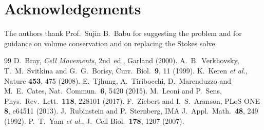 \documentclass[11pt]{article}
\begin{document}
\section*{Acknowledgements}
\noindent
The authors thank Prof.\ Sujin B.\ Babu for suggesting the problem and for
guidance on volume conservation and on replacing the Stokes solve.

{\footnotesize
\begin{thebibliography}{99}
\setlength{\itemsep}{0pt}
\setlength{\parsep}{0pt}
\setlength{\parskip}{0pt}
  D.~Bray, \textit{Cell Movements}, 2nd~ed., Garland (2000).
  A.~B.~Verkhovsky, T.~M.~Svitkina and G.~G.~Borisy, Curr.\ Biol.\ {\bf 9}, 11 (1999).
  K.~Keren \textit{et al.}, Nature {\bf 453}, 475 (2008).
  E.~Tjhung, A.~Tiribocchi, D.~Marenduzzo and M.~E.~Cates, Nat.\ Commun.\ {\bf 6}, 5420 (2015).
  M.~Leoni and P.~Sens, Phys.\ Rev.\ Lett.\ {\bf 118}, 228101 (2017).
  F.~Ziebert and I.~S.~Aranson, PLoS ONE {\bf 8}, e64511 (2013).
  J.~Rubinstein and P.~Sternberg, IMA J.\ Appl.\ Math.\ {\bf 48}, 249 (1992).
  P.~T.~Yam \textit{et al.}, J.\ Cell Biol.\ {\bf 178}, 1207 (2007).
\end{thebibliography}
}
\end{document}
